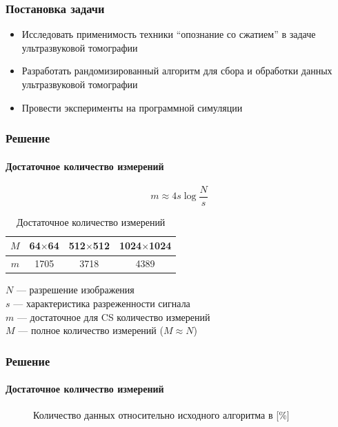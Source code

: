 \documentclass{beamer}
\begin{document}
\begin{frame}
\frametitle{Постановка задачи}
\begin{itemize}
\item Исследовать применимость техники ``опознание со сжатием'' в задаче ультразвуковой томографии
\item Разработать рандомизированный алгоритм для сбора и обработки данных ультразвуковой томографии
\item Провести эксперименты на программной симуляции
\end{itemize}

\end{frame}

\begin{frame}
\frametitle{Решение}
\framesubtitle{Достаточное количество измерений}
$$m \approx 4s\log{\frac{N}{s}}$$
\begin{table}[h]
	\centering
	\caption{Достаточное количество измерений}
	\begin{tabular}{| c | c | c | c |}
    	\hline
		$M$ & 64$\times$64 & 512$\times$512 & 1024$\times$1024 \\
    	\hline
    	$m$ & 1705 & 3718 & 4389 \\
    	\hline
	\end{tabular}
\end{table}

\small
$N$ --- разрешение изображения\\
$s$ --- характеристика разреженности сигнала\\
$m$ --- достаточное для CS количество измерений\\
$M$ --- полное количество измерений ($M\approx N$)
\normalsize

\end{frame}

\begin{frame}
\frametitle{Решение}
\framesubtitle{Достаточное количество измерений}

\begin{figure}[h]
	\centering
	\caption{Количество данных относительно исходного алгоритма в [\%]}
\end{figure}

\end{frame}
\end{document}
